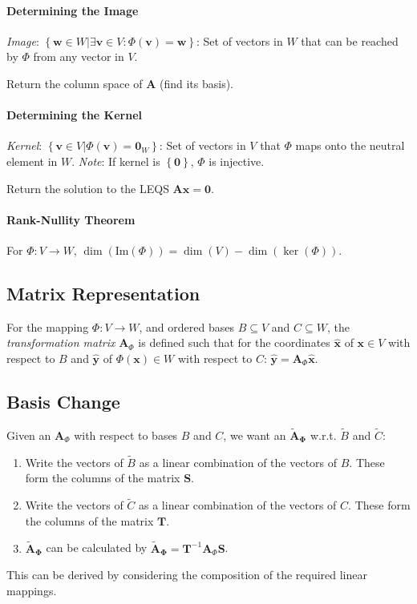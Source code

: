 \documentclass[10pt,twoside,twocolumn]{article}
\begin{document}
\paragraph{Determining the Image}

\emph{Image}: $\left\{ \mathbf{w}\in W|\exists\mathbf{v}\in V:\Phi\left(\mathbf{v}\right)=\mathbf{w}\right\} $:
Set of vectors in $W$ that can be reached by $\Phi$ from any vector
in $V$.

Return the column space of $\mathbf{A}$ (find its basis).


\paragraph{Determining the Kernel}

\emph{Kernel}: $\left\{ \mathbf{v}\in V|\Phi\left(\mathbf{v}\right)=\mathbf{0}_{W}\right\} $:
Set of vectors in $V$ that $\Phi$ maps onto the neutral element
in $W$. \emph{Note}: If kernel is $\left\{ \mathbf{0}\right\} $,
$\Phi$ is injective.

Return the solution to the LEQS $\mathbf{A}\mathbf{x}=\mathbf{0}$.


\paragraph{Rank-Nullity Theorem}

For $\Phi:V\rightarrow W$, $\dim\left(\mbox{Im}\left(\Phi\right)\right)=\dim\left(V\right)-\dim\left(\ker\left(\Phi\right)\right)$.


\subsection{Matrix Representation}

For the mapping $\Phi:V\rightarrow W$, and ordered bases $B\subseteq V$
and $C\subseteq W$, the \emph{transformation matrix} $\mathbf{A}_{\Phi}$
is defined such that for the coordinates $\mathbf{\hat{x}}$ of $\mathbf{x}\in V$
with respect to $B$ and $\mathbf{\hat{y}}$ of $\Phi\left(\mathbf{x}\right)\in W$
with respect to $C$: $\mathbf{\hat{y}}=\mathbf{A}_{\Phi}\mathbf{\hat{x}}$.


\subsection{Basis Change}

Given an $\mathbf{A}_{\Phi}$ with respect to bases $B$ and $C$,
we want an $\mathbf{\tilde{A}_{\Phi}}$ w.r.t. $\tilde{B}$ and $\tilde{C}$: 
\begin{enumerate}
\item Write the vectors of $\tilde{B}$ as a linear combination of the vectors
of $B$. These form the columns of the matrix $\mathbf{S}$. 
\item Write the vectors of $\tilde{C}$ as a linear combination of the vectors
of $C$. These form the columns of the matrix $\mathbf{T}$. 
\item $\mathbf{\tilde{A}_{\Phi}}$ can be calculated by $\mathbf{\tilde{A}_{\Phi}}=\mathbf{T}^{-1}\mathbf{A}_{\Phi}\mathbf{S}$. 
\end{enumerate}
This can be derived by considering the composition of the required
linear mappings.
\end{document}
